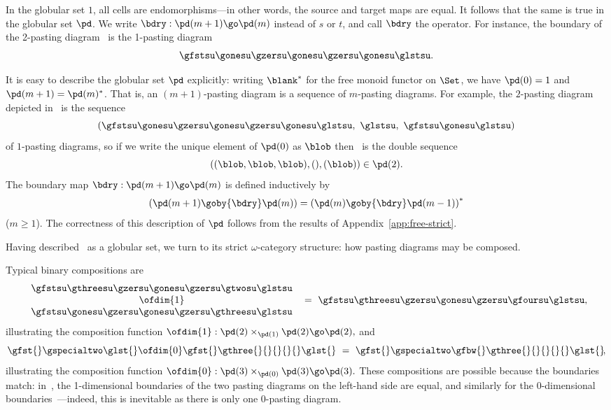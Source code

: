 In the globular set $1$, all cells are endomorphisms---in other words, the
source and target maps are equal.  It follows that the same is true in
the globular set $\pd$.  We write $\bdry: \pd(m+1) \go \pd(m)$%
% 
% 
instead of
$s$ or $t$, and call $\bdry$ the %
%
%
operator.  For instance,
the boundary of the 2-pasting diagram~ is the
1-pasting diagram
\[
\gfstsu
\gonesu
\gzersu
\gonesu
\gzersu
\gonesu
\glstsu.
\]

It is easy to describe%
%
%
the globular set $\pd$ explicitly: writing
$\blank^*$%
% 
% 
for the free monoid functor on $\Set$, we have $\pd(0)=1$ and
%
%
$\pd(m+1) = \pd(m)^*$.  That is, an $(m+1)$-pasting diagram is a
sequence of $m$-pasting diagrams.  For example, the $2$-pasting diagram
depicted in~ is the sequence
\[
(\gfstsu\gonesu\gzersu\gonesu\gzersu\gonesu\glstsu, \ 
\glstsu, \ 
\gfstsu\gonesu\glstsu)
\]
of $1$-pasting diagrams, so if we write the unique element of $\pd(0)$ as
$\blob$ then~ is the double sequence
\[
((\blob, \blob, \blob), (), (\blob)) 
\in \pd(2).
\]
The boundary map $\bdry: \pd(m+1) \go \pd(m)$ is defined inductively by
\[
\left(
\pd(m+1) \goby{\bdry} \pd(m)
\right) 
= 
\left(
\pd(m) \goby{\bdry} \pd(m-1)
\right)^*  
\]
($m\geq 1$).  The correctness of this description of $\pd$ follows from the
results of Appendix~\ref{app:free-strict}.

Having described \pd\ as a globular set, we turn to its strict
$\omega$-category structure: how pasting diagrams may be composed.

Typical binary compositions are
% 
\begin{equation}	\label{eq:bin-1-comp}
\left.
\begin{array}{c}
\gfstsu\gthreesu\gzersu\gonesu\gzersu\gtwosu\glstsu	\\
\ofdim{1}	\\
\gfstsu\gonesu\gzersu\gonesu\gzersu\gthreesu\glstsu
\end{array}
\right.
\ =\ 
\gfstsu\gthreesu\gzersu\gonesu\gzersu\gfoursu\glstsu,
\end{equation}
% 
illustrating the composition function 
$
\ofdim{1}: \pd(2) \times_{\pd(1)} \pd(2) \go \pd(2),
$
and
% 
\begin{equation}	\label{eq:bin-0-comp}
\gfst{}\gspecialtwo\glst{}
\ofdim{0}
\gfst{}\gthree{}{}{}{}{}\glst{}
\ =\ 
\gfst{}\gspecialtwo\gfbw{}\gthree{}{}{}{}{}\glst{}\!,
\end{equation}
%
illustrating the composition function $ \ofdim{0}: \pd(3) \times_{\pd(0)}
\pd(3) \go \pd(3).  $ These compositions are possible because the
boundaries match: in~, the 1-dimensional boundaries of
the two pasting diagrams on the left-hand side are equal, and similarly for
the 0-dimensional boundaries~\bref{eq:bin-0-comp}---indeed, this is
inevitable as there is only one 0-pasting diagram.

